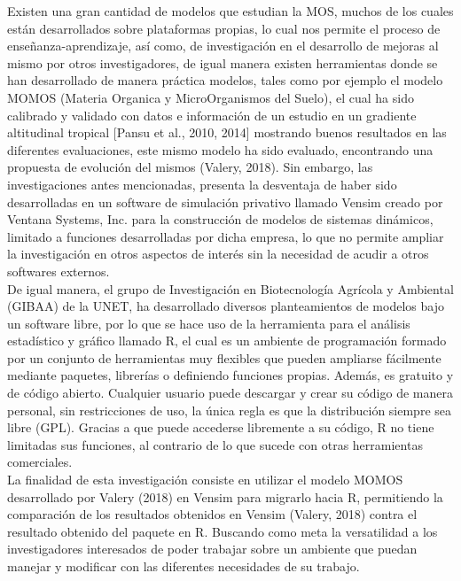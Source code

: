 Existen una gran cantidad de modelos que estudian la MOS, muchos de los cuales est\'an desarrollados sobre plataformas propias, lo cual nos permite el proceso de enseñanza-aprendizaje, así como, de investigaci\'on en el desarrollo de mejoras al mismo por otros investigadores, de igual manera existen herramientas donde se han desarrollado de manera pr\'actica modelos, tales como por ejemplo el modelo MOMOS (Materia Organica y MicroOrganismos del Suelo), el cual ha sido calibrado y validado con datos e informaci\'on de un estudio en un gradiente altitudinal tropical [Pansu et al., 2010, 2014] mostrando buenos resultados en las diferentes evaluaciones, este mismo modelo ha sido evaluado, encontrando una propuesta de evoluci\'on del mismos (Valery, 2018). Sin embargo, las investigaciones antes mencionadas, presenta la desventaja de haber sido desarrolladas en un software de simulaci\'on privativo llamado Vensim creado por Ventana Systems, Inc. para la construcci\'on de modelos de sistemas din\'amicos, limitado a funciones desarrolladas por dicha empresa, lo que no permite ampliar la investigaci\'on en otros aspectos de inter\'es sin la necesidad de acudir a otros softwares externos.\\

De igual manera, el grupo de Investigaci\'on en Biotecnología Agrícola y Ambiental (GIBAA) de la UNET, ha desarrollado diversos planteamientos de modelos bajo un software libre, por lo que se hace uso de la herramienta para el an\'alisis estadístico y gr\'afico llamado R, el cual es un ambiente de programaci\'on formado por un conjunto de herramientas muy flexibles que pueden ampliarse f\'acilmente mediante paquetes, librerías o definiendo funciones propias. Adem\'as, es gratuito y de c\'odigo abierto. Cualquier usuario puede descargar y crear su c\'odigo de manera personal, sin restricciones de uso, la \'unica regla es que la distribuci\'on siempre sea libre (GPL). Gracias a que puede accederse libremente a su c\'odigo, R no tiene limitadas sus funciones, al contrario de lo que sucede con otras herramientas comerciales. \\

La finalidad de esta investigaci\'on consiste en utilizar el modelo MOMOS desarrollado por Valery (2018) en Vensim para migrarlo hacia R, permitiendo la comparaci\'on de los resultados obtenidos en Vensim (Valery, 2018) contra el resultado obtenido del paquete en R. Buscando como meta la versatilidad a los investigadores interesados de poder trabajar sobre un ambiente que puedan manejar y modificar con las diferentes necesidades de su trabajo.\\





